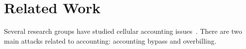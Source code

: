 \chapter{Related Work}
\label{sec:rel}

Several research groups have studied cellular accounting
issues~\cite{peng2014real, go2014gaining, go2013towards,
peng2012mobile,tu2013accounting, peng2012can}. There are two main attacks
related to accounting: accounting bypass and overbilling.

